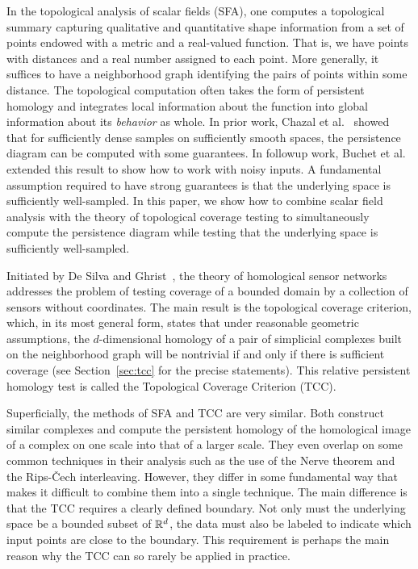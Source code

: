 
In the topological analysis of scalar fields (SFA), one computes a topological summary capturing qualitative and quantitative shape information from a set of points endowed with a metric and a real-valued function.
That is, we have points with distances and a real number assigned to each point.
More generally, it suffices to have a neighborhood graph identifying the pairs of points within some distance.
The topological computation often takes the form of persistent homology and integrates local information about the function into global information about its \emph{behavior} as whole.
In prior work, Chazal et al.~\cite{chazal09analysis} showed that for sufficiently dense samples on sufficiently smooth spaces, the persistence diagram can be computed with some guarantees.
In followup work, Buchet et al.~\cite{buchet15topological} extended this result to show how to work with noisy inputs.
A fundamental assumption required to have strong guarantees is that the underlying space is sufficiently well-sampled.
In this paper, we show how to combine scalar field analysis with the theory of topological coverage testing to simultaneously compute the persistence diagram while testing that the underlying space is sufficiently well-sampled.

Initiated by De Silva and Ghrist~\cite{desilva06coordinate,desilva07coverage,desilva07homological}, the theory of homological sensor networks addresses the problem of testing coverage of a bounded domain by a collection of sensors without coordinates.
The main result is the topological coverage criterion, which, in its most general form, states that under reasonable geometric assumptions, the $d$-dimensional homology of a pair of simplicial complexes built on the neighborhood graph will be nontrivial if and only if there is sufficient coverage (see Section~\ref{sec:tcc} for the precise statements).
This relative persistent homology test is called the Topological Coverage Criterion (TCC).

Superficially, the methods of SFA and TCC are very similar.
Both construct similar complexes and compute the persistent homology of the homological image of a complex on one scale into that of a larger scale.
They even overlap on some common techniques in their analysis such as the use of the Nerve theorem and the Rips-\v{C}ech interleaving.
However, they differ in some fundamental way that makes it difficult to combine them into a single technique.
The main difference is that the TCC requires a clearly defined boundary.
Not only must the underlying space be a bounded subset of $\mathbb{R}^d$, the data must also be labeled to indicate which input points are close to the boundary.
This requirement is perhaps the main reason why the TCC can so rarely be applied in practice.

